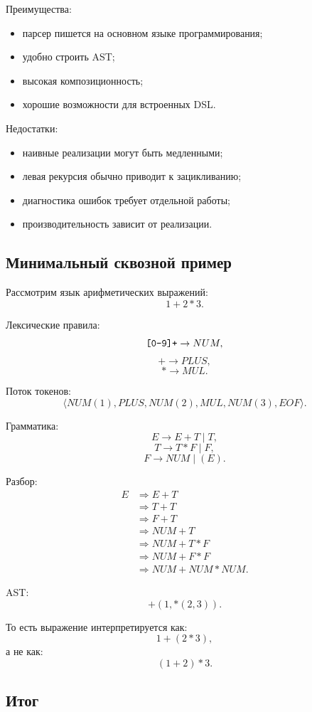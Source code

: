 \documentclass[12pt,a4paper]{article}
\theoremstyle{definition}
\theoremstyle{plain}
\begin{document}
Преимущества:
\begin{itemize}
    \item парсер пишется на основном языке программирования;
    \item удобно строить AST;
    \item высокая композиционность;
    \item хорошие возможности для встроенных DSL.
\end{itemize}

Недостатки:
\begin{itemize}
    \item наивные реализации могут быть медленными;
    \item левая рекурсия обычно приводит к зацикливанию;
    \item диагностика ошибок требует отдельной работы;
    \item производительность зависит от реализации.
\end{itemize}

\subsection{Минимальный сквозной пример}

Рассмотрим язык арифметических выражений:
\[
1+2*3.
\]

Лексические правила:
\[
\text{\texttt{[0-9]+}} \to NUM,
\]
\[
+ \to PLUS,
\]
\[
* \to MUL.
\]

Поток токенов:
\[
\langle NUM(1), PLUS, NUM(2), MUL, NUM(3), EOF \rangle.
\]

Грамматика:
\[
E\to E+T \mid T,
\]
\[
T\to T*F \mid F,
\]
\[
F\to NUM \mid (E).
\]

Разбор:
\[
\begin{aligned}
E &\Rightarrow E+T \\
  &\Rightarrow T+T \\
  &\Rightarrow F+T \\
  &\Rightarrow NUM+T \\
  &\Rightarrow NUM+T*F \\
  &\Rightarrow NUM+F*F \\
  &\Rightarrow NUM+NUM*NUM.
\end{aligned}
\]

AST:
\[
+
\left(
1,
*
\left(
2,
3
\right)
\right).
\]

То есть выражение интерпретируется как:
\[
1+(2*3),
\]
а не как:
\[
(1+2)*3.
\]

\subsection{Итог}
\end{document}
